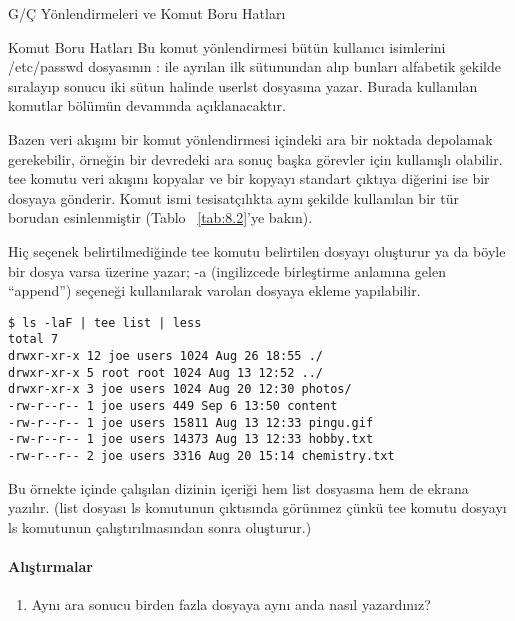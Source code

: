 \begin{section}{G/Ç Yönlendirmeleri ve Komut Boru Hatları}
\begin{subsection}{Komut Boru Hatları}
Bu komut yönlendirmesi bütün kullanıcı isimlerini /etc/passwd dosyasının : ile ayrılan ilk sütunundan alıp bunları alfabetik şekilde sıralayıp sonucu iki sütun halinde userlst dosyasına yazar. Burada kullanılan komutlar bölümün devamında açıklanacaktır.

Bazen veri akışını bir komut yönlendirmesi içindeki ara bir noktada depolamak gerekebilir, örneğin bir devredeki ara sonuç başka görevler için kullanışlı olabilir. tee komutu veri akışını kopyalar ve bir kopyayı standart çıktıya diğerini ise bir dosyaya gönderir. Komut ismi tesisatçılıkta aynı şekilde kullanılan bir tür borudan esinlenmiştir (Tablo ~\ref{tab:8.2}'ye bakın).

Hiç seçenek belirtilmediğinde tee komutu belirtilen dosyayı oluşturur ya da böyle bir dosya varsa üzerine yazar; -a (ingilizcede birleştirme anlamına gelen “append”) seçeneği kullanılarak varolan dosyaya ekleme yapılabilir.

\begin{verbatim}
$ ls -laF | tee list | less
total 7
drwxr-xr-x 12 joe users 1024 Aug 26 18:55 ./
drwxr-xr-x 5 root root 1024 Aug 13 12:52 ../
drwxr-xr-x 3 joe users 1024 Aug 20 12:30 photos/
-rw-r--r-- 1 joe users 449 Sep 6 13:50 content
-rw-r--r-- 1 joe users 15811 Aug 13 12:33 pingu.gif
-rw-r--r-- 1 joe users 14373 Aug 13 12:33 hobby.txt
-rw-r--r-- 2 joe users 3316 Aug 20 15:14 chemistry.txt
\end{verbatim}

Bu örnekte içinde çalışılan dizinin içeriği hem list dosyasına hem de ekrana yazılır. (list dosyası ls komutunun çıktısında görünmez çünkü tee komutu dosyayı ls komutunun çalıştırılmasından sonra oluşturur.)

\paragraph{{\Huge{\PencilLeftDown}}Alıştırmalar}{
\begin{enumerate}
 \item Aynı ara sonucu birden fazla dosyaya aynı anda nasıl yazardınız?
\end{enumerate}}
\end{subsection}
\end{section}

